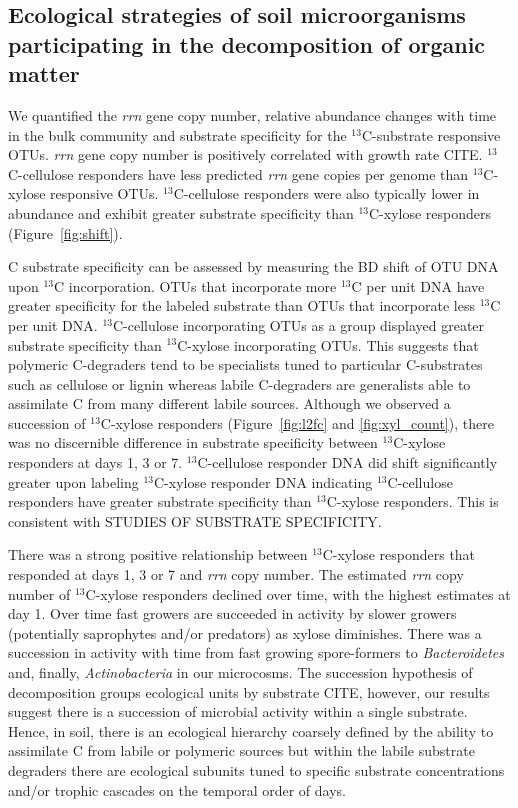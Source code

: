 \subsection{Ecological strategies of soil microorganisms participating in the
decomposition of organic matter}
We quantified the \textit{rrn} gene copy number, relative abundance changes
with time in the bulk community and substrate specificity for the
$^{13}$C-substrate responsive OTUs. \textit{rrn} gene copy number is positively
correlated with growth rate CITE. $^{13}$C-cellulose responders have less
predicted \textit{rrn} gene copies per genome than $^{13}$C-xylose responsive
OTUs. $^{13}$C-cellulose responders were also typically lower in abundance and
exhibit greater substrate specificity than $^{13}$C-xylose responders
(Figure~\ref{fig:shift}). 

C substrate specificity can be assessed by measuring the BD shift of OTU DNA
upon $^{13}$C incorporation. OTUs that incorporate more $^{13}$C per unit DNA
have greater specificity for the labeled substrate than OTUs that incorporate
less $^{13}$C per unit DNA. $^{13}$C-cellulose incorporating OTUs as a group
displayed greater substrate specificity than $^{13}$C-xylose incorporating
OTUs. This suggests that polymeric C-degraders tend to be specialists tuned to
particular C-substrates such as cellulose or lignin whereas labile C-degraders
are generalists able to assimilate C from many different labile sources.
Although we observed a succession of $^{13}$C-xylose responders
(Figure~\ref{fig:l2fc} and \ref{fig:xyl_count}), there was no discernible
difference in substrate specificity between $^{13}$C-xylose responders at days
1, 3 or 7. $^{13}$C-cellulose responder DNA did shift significantly greater
upon labeling $^{13}$C-xylose responder DNA indicating $^{13}$C-cellulose
responders have greater substrate specificity than $^{13}$C-xylose responders.
This is consistent with STUDIES OF SUBSTRATE SPECIFICITY.

There was a strong positive relationship between $^{13}$C-xylose
responders that responded at days 1,
3 or 7 and \textit{rrn} copy number. The estimated \textit{rrn} copy number of
$^{13}$C-xylose responders declined over time, with the highest estimates at
day 1. Over time fast growers are succeeded in activity by slower growers
(potentially saprophytes and/or predators) as xylose diminishes. There was
a succession in activity with time from fast growing spore-formers to
\textit{Bacteroidetes} and, finally, \textit{Actinobacteria} in our microcosms.
The succession hypothesis of decomposition groups ecological units by substrate
CITE, however, our results suggest there is a succession of microbial activity
within a single substrate. Hence, in soil, there is an ecological hierarchy
coarsely defined by the ability to assimilate C from labile or polymeric
sources but within the labile substrate degraders there are ecological subunits
tuned to specific substrate concentrations and/or trophic cascades on the
temporal order of days. 


